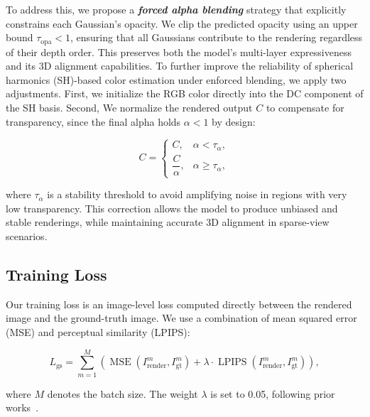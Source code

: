 To address this, we propose a \textbf{\textit{forced alpha blending}} strategy that explicitly constrains each Gaussian’s opacity. We clip the predicted opacity using an upper bound $\tau_{\text{opa}} < 1$, ensuring that all Gaussians contribute to the rendering regardless of their depth order. This preserves both the model's multi-layer expressiveness and its 3D alignment capabilities.
To further improve the reliability of spherical harmonics (SH)-based color estimation under enforced blending, we apply two adjustments. First, we initialize the RGB color directly into the DC component of the SH basis. Second, 
We normalize the rendered output $C$ to compensate for transparency, since the final alpha holds $\alpha < 1$ by design:

\begin{equation}
C = 
\begin{cases}
C, & \alpha < \tau_\alpha, \\
\dfrac{C}{\alpha}, & \alpha \geq \tau_\alpha,
\end{cases}
\end{equation}

\noindent
where $\tau_\alpha$ is a stability threshold to avoid amplifying noise in regions with very low transparency. This correction allows the model to produce unbiased and stable renderings, while maintaining accurate 3D alignment in sparse-view scenarios.


\subsection{Training Loss}

Our training loss is an image-level loss computed directly between the rendered image and the ground-truth image. We use a combination of mean squared error (MSE) and perceptual similarity (LPIPS):

\begin{equation}
L_{\mathrm{gs}} = \sum_{m=1}^{M} \left( 
\operatorname{MSE}\left(I_{\mathrm{render}}^m, I_{\mathrm{gt}}^m\right) 
+ \lambda \cdot \operatorname{LPIPS}\left(I_{\mathrm{render}}^m, I_{\mathrm{gt}}^m\right) 
\right),
\end{equation}

\noindent
where $M$ denotes the batch size. The weight $\lambda$ is set to 0.05, following prior works~\cite{charatan2024pixelsplat,chen2024mvsplat,xu2024depthsplat}.



